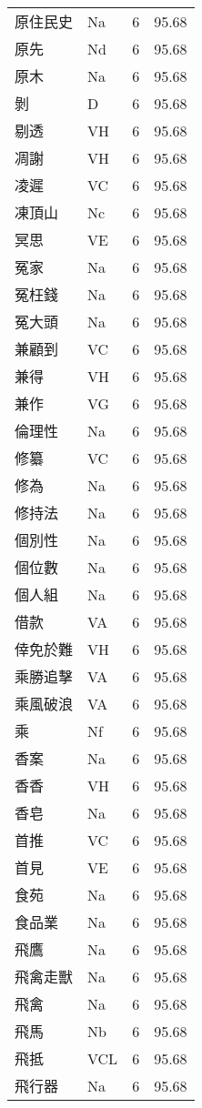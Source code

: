 \documentclass[twocolumn]{book}
\begin{document}
\begin{supertabular}{llrr}
原住民史 & Na & 6 &  95.68\\
原先 & Nd & 6 &  95.68\\
原木 & Na & 6 &  95.68\\
剝 & D & 6 &  95.68\\
剔透 & VH & 6 &  95.68\\
凋謝 & VH & 6 &  95.68\\
凌遲 & VC & 6 &  95.68\\
凍頂山 & Nc & 6 &  95.68\\
冥思 & VE & 6 &  95.68\\
冤家 & Na & 6 &  95.68\\
冤枉錢 & Na & 6 &  95.68\\
冤大頭 & Na & 6 &  95.68\\
兼顧到 & VC & 6 &  95.68\\
兼得 & VH & 6 &  95.68\\
兼作 & VG & 6 &  95.68\\
倫理性 & Na & 6 &  95.68\\
修纂 & VC & 6 &  95.68\\
修為 & Na & 6 &  95.68\\
修持法 & Na & 6 &  95.68\\
個別性 & Na & 6 &  95.68\\
個位數 & Na & 6 &  95.68\\
個人組 & Na & 6 &  95.68\\
借款 & VA & 6 &  95.68\\
倖免於難 & VH & 6 &  95.68\\
乘勝追擊 & VA & 6 &  95.68\\
乘風破浪 & VA & 6 &  95.68\\
乘 & Nf & 6 &  95.68\\
香案 & Na & 6 &  95.68\\
香香 & VH & 6 &  95.68\\
香皂 & Na & 6 &  95.68\\
首推 & VC & 6 &  95.68\\
首見 & VE & 6 &  95.68\\
食苑 & Na & 6 &  95.68\\
食品業 & Na & 6 &  95.68\\
飛鷹 & Na & 6 &  95.68\\
飛禽走獸 & Na & 6 &  95.68\\
飛禽 & Na & 6 &  95.68\\
飛馬 & Nb & 6 &  95.68\\
飛抵 & VCL & 6 &  95.68\\
飛行器 & Na & 6 &  95.68\\

\end{supertabular}
\end{document}
